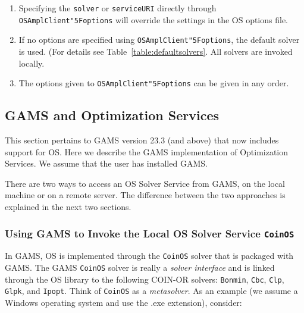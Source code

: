 \documentclass[11pt]{article}
\renewcommand{\_}{{\char"5F}}
\renewcommand{\{}{{\char"7B}}
\renewcommand{\}}{{\char"7D}}
\renewcommand{\^}{{\char"0D}}
\renewcommand{\'}{{\char"0D}}
\begin{document}
\begin{enumerate}[Step 1:]
\begin{enumerate}
\item Specifying the {\tt solver} or {\tt serviceURI} directly through {\tt OSAmplClient\_options} 
will override the settings in the OS options file.

\item If no options are specified using {\tt OSAmplClient\_options},  the default solver is used.
(For details see Table~\ref{table:defaultsolvers}.
%
%
All solvers are invoked locally. 

\item  The options given to {\tt OSAmplClient\_options}  can be given in any order.



\end{enumerate}




\subsection{GAMS and Optimization Services}\label{section:gamslinks}


This section pertains to GAMS version 23.3 (and above) that now includes support for OS.  
Here we describe the GAMS  implementation of Optimization Services.  We assume that the user has installed GAMS.

There are two ways to access an OS Solver Service from GAMS, on the local machine or on a remote server.
The difference between the two approaches is explained in the next two sections.

\subsubsection{Using GAMS to Invoke the Local OS Solver Service \tt CoinOS}\label{section:gamslocal}

   
In GAMS,  OS is implemented through the {\tt CoinOS} solver that is packaged with GAMS.      
The GAMS {\tt CoinOS} solver is really a {\it solver interface} and is linked through the OS library to the 
following COIN-OR solvers: {\tt Bonmin}, {\tt Cbc}, {\tt Clp},  {\tt Glpk}, and {\tt Ipopt}. 
Think of {\tt CoinOS} as a {\it metasolver}.    As an example (we assume a Windows operating system 
and use the .exe extension), consider:


\end{enumerate}
\end{document}
